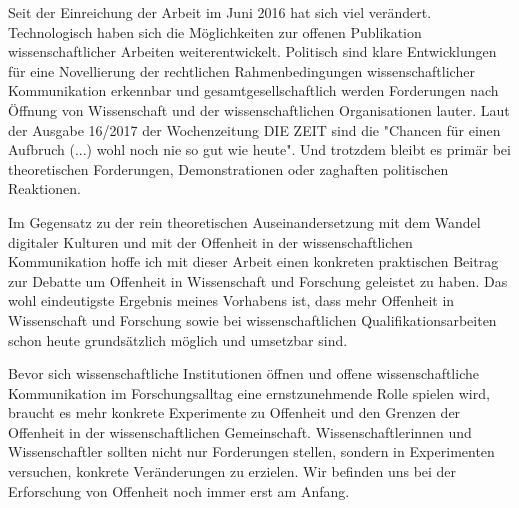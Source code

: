 Seit der Einreichung der Arbeit im Juni 2016 hat sich viel verändert. Technologisch haben sich die Möglichkeiten zur offenen Publikation wissenschaftlicher Arbeiten weiterentwickelt. Politisch sind klare Entwicklungen für eine Novellierung der rechtlichen Rahmenbedingungen wissenschaftlicher Kommunikation erkennbar und gesamtgesellschaftlich werden Forderungen nach Öffnung von Wissenschaft und der wissenschaftlichen Organisationen lauter. Laut der Ausgabe 16/2017 der Wochenzeitung DIE ZEIT sind die "Chancen für einen Aufbruch (...) wohl noch nie so gut wie heute". Und trotzdem bleibt es primär bei theoretischen Forderungen, Demonstrationen oder zaghaften politischen Reaktionen.

Im Gegensatz zu der rein theoretischen Auseinandersetzung mit dem Wandel digitaler Kulturen und mit der Offenheit in der wissenschaftlichen Kommunikation hoffe ich mit dieser Arbeit einen konkreten praktischen Beitrag zur Debatte um Offenheit in Wissenschaft und Forschung geleistet zu haben. Das wohl eindeutigste Ergebnis meines Vorhabens ist, dass mehr Offenheit in Wissenschaft und Forschung sowie bei wissenschaftlichen Qualifikationsarbeiten schon heute grundsätzlich möglich und umsetzbar sind.

Bevor sich wissenschaftliche Institutionen öffnen und offene wissenschaftliche Kommunikation im Forschungsalltag eine ernstzunehmende Rolle spielen wird, braucht es mehr konkrete Experimente zu Offenheit und den Grenzen der Offenheit in der wissenschaftlichen Gemeinschaft. Wissenschaftlerinnen und Wissenschaftler sollten nicht nur Forderungen stellen, sondern in Experimenten versuchen, konkrete Veränderungen zu erzielen. Wir befinden uns bei der Erforschung von Offenheit noch immer erst am Anfang.
